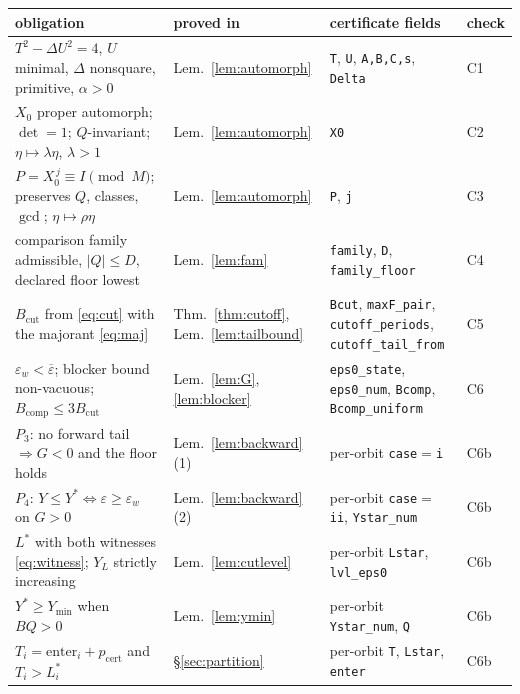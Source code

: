 \documentclass[11pt]{article}
\theoremstyle{definition}
\theoremstyle{remark}
\newcommand{\epsbar}{\overline{\varepsilon}}
\newcommand{\epsw}{\varepsilon_w}
\begin{document}
{\footnotesize
\setlength{\tabcolsep}{3pt}
\begin{longtable}{@{}>{\raggedright\arraybackslash}p{5.0cm}
                    >{\raggedright\arraybackslash}p{2.3cm}
                    >{\raggedright\arraybackslash}p{5.2cm}
                    >{\raggedright\arraybackslash}p{1.1cm}@{}}
\toprule
obligation & proved in & certificate fields & check \\
\midrule
\endhead
$T^2-\Delta U^2=4$, $U$ minimal, $\Delta$ nonsquare, primitive, $\alpha>0$ &
  Lem.~\ref{lem:automorph} & \texttt{T}, \texttt{U}, \texttt{A,B,C,s}, \texttt{Delta} & C1 \\
$X_0$ proper automorph; $\det=1$; $Q$-invariant; $\eta\mapsto\lambda\eta$, $\lambda>1$ &
  Lem.~\ref{lem:automorph} & \texttt{X0} & C2 \\
$P=X_0^{\,j}\equiv I\!\!\pmod M$; preserves $Q$, classes, $\gcd$; $\eta\mapsto\rho\eta$ &
  Lem.~\ref{lem:automorph} & \texttt{P}, \texttt{j} & C3 \\
comparison family admissible, $|Q|\le D$, declared floor lowest &
  Lem.~\ref{lem:fam} & \texttt{family}, \texttt{D}, \texttt{family\_floor} & C4 \\
$B_{\mathrm{cut}}$ from \eqref{eq:cut} with the majorant \eqref{eq:maj} &
  Thm.~\ref{thm:cutoff}, Lem.~\ref{lem:tailbound} &
  \texttt{Bcut}, \texttt{maxF\_pair}, \texttt{cutoff\_periods}, \texttt{cutoff\_tail\_from} & C5 \\
$\epsw<\epsbar$; blocker bound non-vacuous; $B_{\mathrm{comp}}\le3B_{\mathrm{cut}}$ &
  Lem.~\ref{lem:G}, \ref{lem:blocker} &
  \texttt{eps0\_state}, \texttt{eps0\_num}, \texttt{Bcomp}, \texttt{Bcomp\_uniform} & C6 \\
$P_3$: no forward tail $\Rightarrow G<0$ and the floor holds &
  Lem.~\ref{lem:backward}(1) & per-orbit \texttt{case}$=$\texttt{i} & C6b \\
$P_4$: $Y\le Y^{*}\!\iff\!\varepsilon\ge\epsw$ on $G>0$ &
  Lem.~\ref{lem:backward}(2) & per-orbit \texttt{case}$=$\texttt{ii}, \texttt{Ystar\_num} & C6b \\
$L^{*}$ with both witnesses \eqref{eq:witness}; $Y_L$ strictly increasing &
  Lem.~\ref{lem:cutlevel} & per-orbit \texttt{Lstar}, \texttt{lvl\_eps0} & C6b \\
$Y^{*}\ge Y_{\min}$ when $BQ>0$ & Lem.~\ref{lem:ymin} & per-orbit \texttt{Ystar\_num},
  \texttt{Q} & C6b \\
$T_i=\mathrm{enter}_i+p_{\mathrm{cert}}$ and $T_i>L_i^{*}$ &
  \S\ref{sec:partition} & per-orbit \texttt{T}, \texttt{Lstar}, \texttt{enter} & C6b \\

\end{longtable}}
\end{document}
